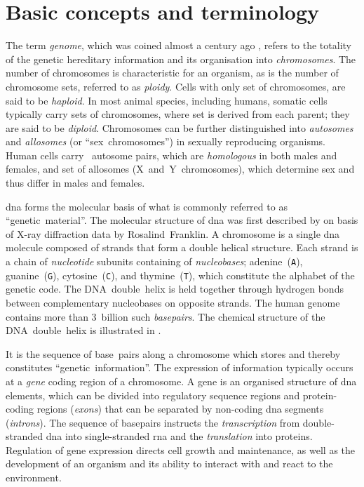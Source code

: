%
\section{Basic concepts and terminology}
\label{sec:basics}
%

The term \emph{genome}, which was coined almost a century ago \citep{Winkler1920}, refers to the totality of the genetic hereditary information and its organisation into \emph{chromosomes}.
The number of chromosomes is characteristic for an organism, as is the number of chromosome sets, referred to as \emph{ploidy}.
Cells with only  set of chromosomes, are said to be \emph{haploid}.
In most animal species, including humans, somatic cells typically carry  sets of chromosomes, where  set is derived from each parent; \ie they are said to be \emph{diploid}.
Chromosomes can be further distinguished into \emph{autosomes} and \emph{allosomes} (or ``sex~chromosomes'') in sexually reproducing organisms.
Human cells carry ~autosome pairs, which are \emph{homologous} in both males and females, and  set of allosomes (X~and~Y~chromosomes), which determine sex and thus differ in males and females.

\Gls{dna} forms the molecular basis of what is commonly referred to as ``genetic~material''.
The molecular structure of \gls{dna} was first described by \citet{Watson:1953ug} on basis of X-ray diffraction data by Rosalind~Franklin.
A chromosome is a single \gls{dna} molecule composed of  strands that form a double helical structure.
Each strand is a chain of \emph{nucleotide} subunits containing  of  \emph{nucleobases}; adenine~(\texttt{A}), guanine~(\texttt{G}), cytosine~(\texttt{C}), and thymine~(\texttt{T}), which constitute the alphabet of the genetic code.
The DNA~double~helix is held together through hydrogen bonds between complementary nucleobases on opposite strands.
The human genome contains more than 3~billion such \emph{basepairs}.
The chemical structure of the DNA~double~helix is illustrated in .

%

%

It is the sequence of base~pairs along a chromosome which stores and thereby constitutes ``genetic~information''.
The expression of information typically occurs at a \emph{gene} coding region of a chromosome.
A gene is an organised structure of \gls{dna} elements, which can be divided into regulatory sequence regions and protein-coding regions (\emph{exons}) that can be separated by non-coding \gls{dna} segments (\emph{introns}).
The sequence of basepairs instructs the \emph{transcription} from double-stranded \gls{dna} into single-stranded \gls{rna} and the \emph{translation} into proteins.
Regulation of gene expression directs cell growth and maintenance, as well as the development of an organism and its ability to interact with and react to the environment.

